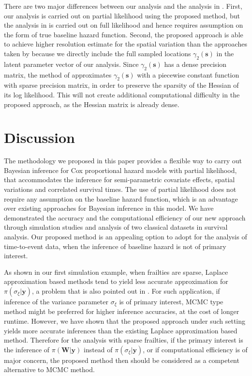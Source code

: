 \documentclass[ba]{imsart}
\begin{document}
There are two major differences between our analysis and the analysis in \cite{inlacoxph}. First, our analysis is carried out on partial likelihood using the proposed method, but the analysis in \cite{inlacoxph} is carried out on full likelihood and hence requires assumption on the form of true baseline hazard function. Second, the proposed approach is able to achieve higher resolution estimate for the spatial variation than the approaches taken by \cite{inlacoxph} because we directly include the full sampled locations $\gamma_2(\boldsymbol{s})$ in the latent parameter vector of our analysis. Since $\gamma_2(\boldsymbol{s})$ has a dense precision matrix, the method of \cite{inlacoxph} approximates $\gamma_2(\boldsymbol{s})$ with a piecewise constant function with sparse precision matrix, in order to preserve the sparsity of the Hessian of its log likelihood. This will not create additional computational difficulty in the proposed approach, as the Hessian matrix is already dense.


\section{Discussion}\label{sec:discussion}


The methodology we proposed in this paper provides a flexible way to carry out Bayesian inference for Cox proportional hazard models with partial likelihood, that accommodates the inference for semi-parametric covariate effects, spatial variations and correlated survival times. The use of partial likelihood does not require any assumption on the baseline hazard function, which is an advantage over existing approaches for Bayesian inference in this model. We have demonstrated the accuracy and the computational efficiency of our new approach through simulation studies and analysis of two classical datasets in survival analysis. Our proposed method is an appealing option to adopt for the analysis of time-to-event data, when the inference of baseline hazard is not of primary interest.

As shown in our first simulation example, when frailties are sparse, Laplace approximation based methods tend to yield less accurate approximation for $\pi(\sigma_\xi|\boldsymbol{y})$, a problem that is also pointed out in \cite{Ogden2013ASR}. For such application, if inference of the variance parameter $\sigma_\xi$ is of primary interest, MCMC type method might be preferred for higher inference accuracies, at the cost of longer runtime. However, we have shown that the proposed approach under such setting yields more accurate inferences than the existing Laplace approximation based method. Therefore for the analysis with sparse frailties, if the primary interest is the inference of $\pi(\boldsymbol{W}|\boldsymbol{y})$ instead of $\pi(\sigma_\xi|\boldsymbol{y})$, or if computational efficiency is of major concern, the proposed method then should be considered as a competent alternative to MCMC method.
\end{document}
